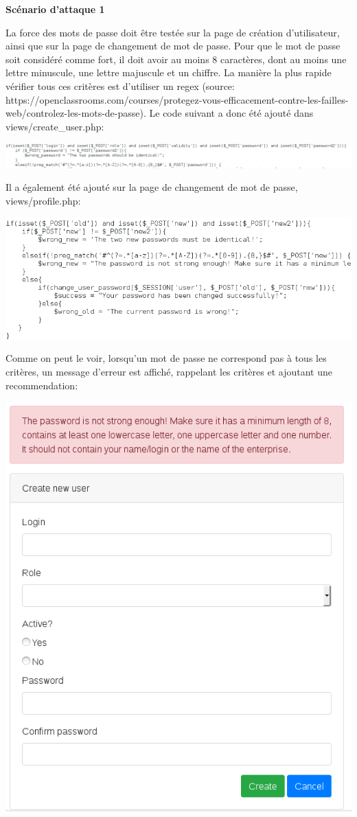 \documentclass{article}
\begin{document}
\textbf{Scénario d'attaque 1}

La force des mots de passe doit être testée sur la page de création
d'utilisateur, ainsi que sur la page de changement de mot de passe. Pour
que le mot de passe soit considéré comme fort, il doit avoir au moins 8
caractères, dont au moins une lettre minuscule, une lettre majuscule et
un chiffre. La manière la plus rapide vérifier tous ces critères est
d'utiliser un regex (source:
https://openclassrooms.com/courses/protegez-vous-efficacement-contre-les-failles-web/controlez-les-mots-de-passe).
Le code suivant a donc été ajouté dans views/create\_user.php:

\includegraphics[width=\textwidth]{images/password.PNG}

Il a également été ajouté sur la page de changement de mot de passe,
views/profile.php:

\includegraphics[width=\textwidth]{images/password3.PNG}

Comme on peut le voir, lorsqu'un mot de passe ne correspond pas à tous
les critères, un message d'erreur est affiché, rappelant les critères et
ajoutant une recommendation:

\includegraphics[width=\textwidth]{images/password2.PNG}
\end{document}
